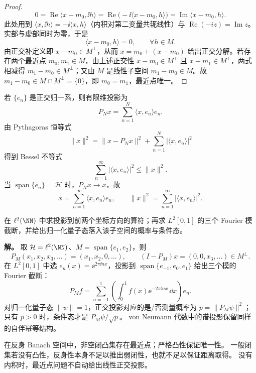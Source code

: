 \begin{proof}
\begin{equation*}
0=\operatorname{Re}\langle x-m_0,\ii h\rangle
=\operatorname{Re}\bigl(-\ii\langle x-m_0,h\rangle\bigr)
=\operatorname{Im}\langle x-m_0,h\rangle.
\end{equation*}
此处用到 $\langle x,\ii h\rangle=-\ii\langle x,h\rangle$（内积对第二变量共轭线性）与 $\operatorname{Re}(-iz)=\operatorname{Im}z$。实部与虚部同时为零，于是
\begin{equation*}
\langle x-m_0,h\rangle=0,
\qquad \forall h\in M.
\end{equation*}
由正交补定义即 $x-m_0\in M^\perp$，从而 $x=m_0+(x-m_0)$ 给出正交分解。若存在两个最近点 $m_0,m_1\in M$，由上述正交性 $x-m_0\in M^\perp$ 且 $x-m_1\in M^\perp$，两式相减得 $m_1-m_0\in M^\perp$；又由 $M$ 是线性子空间 $m_1-m_0\in M$。故 $m_1-m_0\in M\cap M^\perp=\{0\}$，即 $m_0=m_1$，最近点唯一。
\end{proof}


\begin{proposition}
若 $\{e_n\}$ 是正交归一系，则有限维投影为
\[
P_Nx=\sum_{n=1}^N \langle x,e_n\rangle e_n.
\]
由 Pythagoras 恒等式
\[
\|x\|^2
=\|x-P_Nx\|^2+
\sum_{n=1}^N|\langle x,e_n\rangle|^2
\]
得到 Bessel 不等式
\[
\sum_{n=1}^\infty|\langle x,e_n\rangle|^2\le\|x\|^2.
\]
当 $\overline{\operatorname{span}\{e_n\}}=\mathcal H$ 时，$P_Nx\to x$，故
\[
{x=\sum_{n=1}^\infty\langle x,e_n\rangle e_n},
\qquad
{\|x\|^2=\sum_{n=1}^\infty|\langle x,e_n\rangle|^2}.
\]
\end{proposition}

\begin{example}
在 $\ell^2(\NN)$ 中求投影到前两个坐标方向的算符；再求 $L^2[0,1]$ 的三个 Fourier 模截断，并给出归一化量子态落入该子空间的概率与条件态。

\textbf{解。} 取 $\mathcal H=\ell^2(\NN)$、$M=\operatorname{span}\{e_1,e_2\}$，则
\[
P_M(x_1,x_2,x_3,\dots)=(x_1,x_2,0,\dots),\qquad
(I-P_M)x=(0,0,x_3,\dots)\in M^\perp.
\]
在 $L^2[0,1]$ 中选 $e_n(x)=\ee^{2\pi\ii nx}$，投影到
$\operatorname{span}\{e_{-1},e_0,e_1\}$ 给出三个模的 Fourier 截断：
\[
P_Mf=\sum_{n=-1}^1\left(\int_0^1 f(x)\ee^{-2\pi\ii nx}\,\dd x\right)e_n.
\]
对归一化量子态 $\|\psi\|=1$，正交投影对应的是/否测量概率为
$p=\|P_M\psi\|^2$；只有 $p>0$ 时，条件态才是 $P_M\psi/\sqrt p$。
von Neumann 代数中的谱投影保留同样的自伴幂等结构。
\end{example}

\begin{note}
在反身 Banach 空间中，非空闭凸集存在最近点；严格凸性保证唯一性。
一般闭集若没有凸性，反身性本身不足以推出弱闭性，也就不足以保证距离取得。
没有内积时，最近点问题不自动给出线性正交投影。
\end{note}

